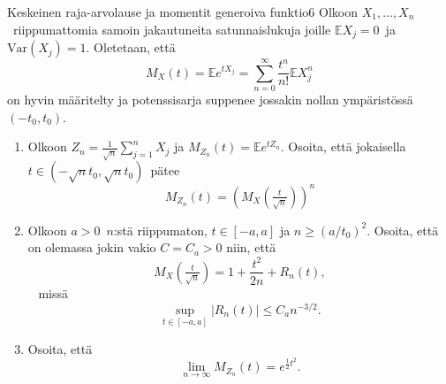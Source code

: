 \documentclass[11pt,a4paper]{amsart}
\newcommand{\E}{\mathbb{E}}
\newcommand{\1}{\mathbf{1}}
\begin{document}
 \begin{Exercises}{Keskeinen raja-arvolause ja momentit generoiva funktio}{6}
Olkoon $X_1,...,X_n$ riippumattomia samoin jakautuneita satunnaislukuja joille $\E X_j=0$ ja $\mathrm{Var}(X_j)=1$. Oletetaan, että 
\[
M_X(t)=\E e^{tX_j}=\sum_{n=0}^\infty \frac{t^n}{n!}\E X_j^n
\]
on hyvin määritelty ja potenssisarja suppenee jossakin nollan ympäristössä $(-t_0,t_0)$.



\begin{enumerate}
\item Olkoon $Z_n=\frac{1}{\sqrt{n}}\sum_{j=1}^n X_j$ ja $M_{Z_n}(t)=\E e^{t Z_n}$. Osoita, että jokaisella $t\in (-\sqrt{n}t_0,\sqrt{n}t_0)$ pätee
\[
M_{Z_n}(t)=\left(M_X(\tfrac{t}{\sqrt{n}})\right)^n
\]

    
\item Olkoon $a>0$ $n$:stä riippumaton, $t\in [-a,a]$ ja $n\geq (a/t_0)^2$. Osoita, että on olemassa jokin vakio $C=C_a>0$ niin, että 
\[
M_X(\tfrac{t}{\sqrt{n}})=1+\frac{t^2}{2n}+R_n(t),
\] 
missä 
\[
\sup_{t\in [-a,a]}|R_n(t)|\leq C_a n^{-3/2}.
\]


\item Osoita, että 
\[
\lim_{n\to\infty}M_{Z_n}(t)=e^{\frac{1}{2}t^2}.
\]

    
\end{enumerate}
\end{Exercises}
\end{document}

